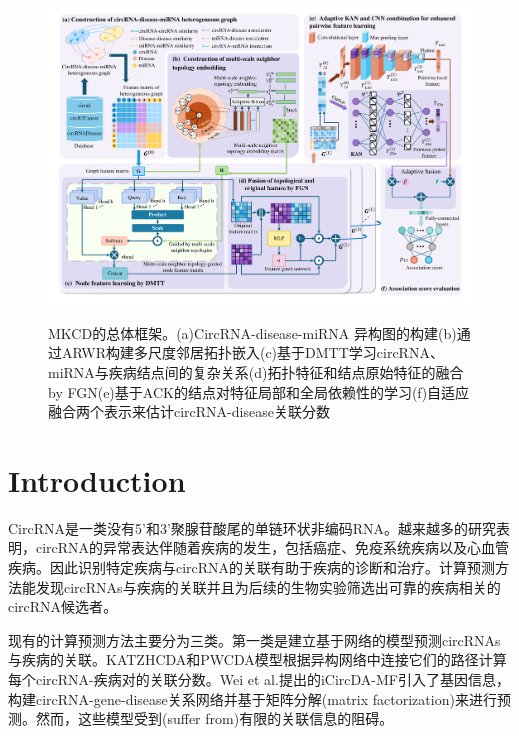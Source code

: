\documentclass{bioinfo}
\begin{document}
\begin{methods}
\begin{figure}[t]
	\centering
	\includegraphics[width=8in]{fig/visio1.pdf}\\
	\vspace{0.2cm}
	\caption{MKCD的总体框架。(a)CircRNA-disease-miRNA 异构图的构建(b)通过ARWR构建多尺度邻居拓扑嵌入(c)基于DMTT学习circRNA、miRNA与疾病结点间的复杂关系(d)拓扑特征和结点原始特征的融合 by FGN(e)基于ACK的结点对特征局部和全局依赖性的学习(f)自适应融合两个表示来估计circRNA-disease关联分数}
	\label{fig:visio1}
	\vspace{0.1cm}
\end{figure}


\section{Introduction}
CircRNA是一类没有5'和3'聚腺苷酸尾的单链环状非编码RNA\cite{jeck2014detecting}。越来越多的研究表明，circRNA的异常表达伴随着疾病的发生\cite{abdelmohsen2017identification}，包括癌症\cite{gao2019circular,li2019tumor,liang2020autophagy}、免疫系统疾病\cite{wang2018circibtk}以及心血管疾病\cite{khan2016rbm20,siede2017identification,jin2019silencing}。因此识别特定疾病与circRNA的关联有助于疾病的诊断和治疗。计算预测方法能发现circRNAs与疾病的关联并且为后续的生物实验筛选出可靠的疾病相关的circRNA候选者\cite{lan2023benchmarking,yang2021predicting}。

现有的计算预测方法主要分为三类。第一类是建立基于网络的模型预测circRNAs与疾病的关联。KATZHCDA和PWCDA模型根据异构网络中连接它们的路径计算每个circRNA-疾病对的关联分数\cite{fan2018prediction, lei2018pwcda}。Wei et al.提出的iCircDA-MF引入了基因信息，构建circRNA-gene-disease关系网络并基于矩阵分解(matrix factorization)来进行预测\cite{wei2020icircda}。然而，这些模型受到(suffer from)有限的关联信息的阻碍。


\end{methods}
\end{document}
